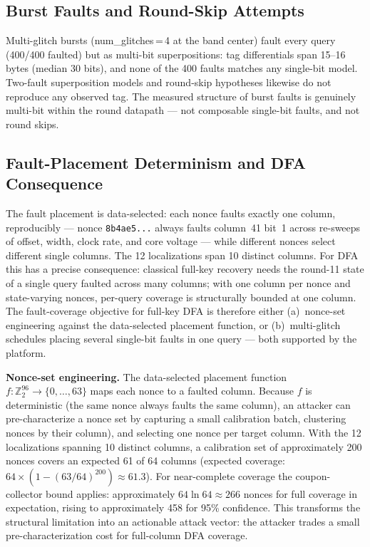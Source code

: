 \documentclass[conference]{IEEEtran}
\begin{document}
\subsection{Burst Faults and Round-Skip Attempts}

Multi-glitch bursts (num\_glitches\,=\,4 at the band center)
fault every query (400/400 faulted) but as multi-bit
superpositions: tag differentials span 15--16 bytes (median
30 bits), and none of the 400 faults matches any single-bit
model. Two-fault superposition models and round-skip hypotheses
likewise do not reproduce any observed tag. The measured
structure of burst faults is genuinely multi-bit within the
round datapath — not composable single-bit faults, and not
round skips.

\subsection{Fault-Placement Determinism and DFA Consequence}

The fault placement is data-selected: each nonce faults exactly
one column, reproducibly — nonce \texttt{8b4ae5...} always
faults column~41 bit~1 across re-sweeps of offset, width,
clock rate, and core voltage — while different nonces select
different single columns. The 12 localizations span 10 distinct
columns. For DFA this has a precise consequence: classical
full-key recovery needs the round-11 state of a single query
faulted across many columns; with one column per nonce and
state-varying nonces, per-query coverage is structurally bounded
at one column. The fault-coverage objective for full-key DFA
is therefore either (a)~nonce-set engineering against the
data-selected placement function, or (b)~multi-glitch schedules
placing several single-bit faults in one query — both supported
by the platform.

\noindent\textbf{Nonce-set engineering.} The data-selected
placement function $f: \mathbb{Z}_2^{96} \rightarrow
\{0,\ldots,63\}$ maps each nonce to a faulted column. Because
$f$ is deterministic (the same nonce always faults the same
column), an attacker can pre-characterize a nonce set by
capturing a small calibration batch, clustering nonces by their
column), and selecting one nonce per target column. With
the 12 localizations spanning 10 distinct columns, a calibration
set of approximately 200 nonces covers an expected 61 of 64
columns (expected coverage: $64 \times (1 - (63/64)^{200})
\approx 61.3$). For near-complete coverage the coupon-collector
bound applies: approximately $64 \ln 64 \approx 266$ nonces for
full coverage in expectation, rising to approximately 458 for
95\% confidence. This transforms the structural limitation into
an actionable attack vector: the attacker trades a small
pre-characterization cost for full-column DFA coverage.
\end{document}
